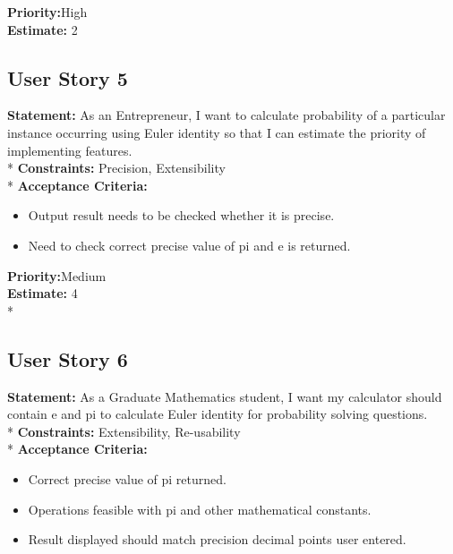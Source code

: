 \documentclass[12pt]{article}
\begin{document}
\noindent \textbf {Priority:}High\\[0.4cm]
\newline
\noindent \textbf {Estimate:} 2\\[2cm]


\subsection{User Story 5} %

\noindent \textbf {Statement: }As an Entrepreneur, I want to calculate probability of a particular instance occurring using Euler identity  so that I can estimate the priority of implementing features. \\*
\newline 
\noindent \textbf {Constraints:}  Precision, Extensibility\\*
\newline
\textbf{Acceptance Criteria: } 
\begin{itemize}
  \item Output result needs to be checked whether it is precise.
  \item Need to check correct precise value of pi and e is returned.
  
\end{itemize}

\noindent \textbf {Priority:}Medium\\[0.4cm]
\newline
\noindent \textbf {Estimate:} 4\\*
\newline

\newpage
\subsection{User Story 6} %

\noindent \textbf {Statement: }As a Graduate Mathematics student, I want my calculator should contain e and pi to calculate Euler identity for probability solving questions. \\*
\newline 
\noindent \textbf {Constraints:}  Extensibility, Re-usability\\*
\newline
\textbf{Acceptance Criteria: } 
\begin{itemize}
  \item Correct precise value of pi returned.
  \item Operations feasible with pi and other mathematical constants.
  \item Result displayed should match precision decimal points user entered.\newline
\end{itemize}
\end{document}
